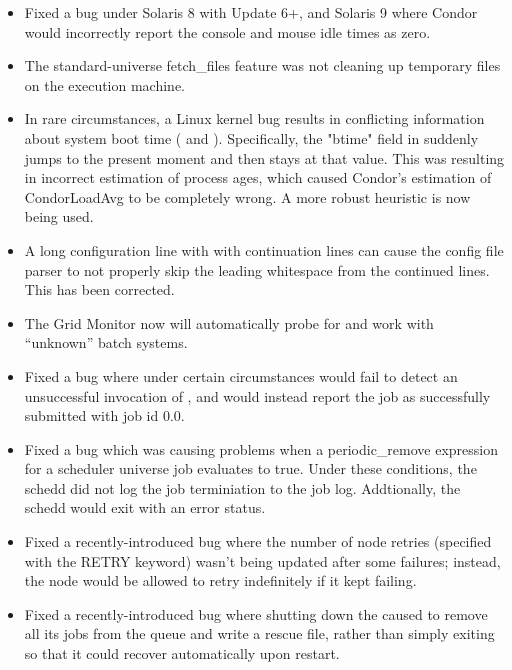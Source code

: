 \begin{itemize}

\item Fixed a bug under Solaris 8 with Update 6+, and Solaris 9 where
Condor would incorrectly report the console and mouse idle times as zero.

\item The standard-universe fetch\_files feature was not cleaning up
temporary files on the execution machine.

\item In rare circumstances, a Linux kernel bug results in conflicting
information about system boot time ( and
). 
Specifically, the "btime" field in  suddenly jumps to
the present moment and then stays at that value.  This
was resulting in incorrect estimation of process ages, which caused
Condor's estimation of CondorLoadAvg to be completely wrong.  A more
robust heuristic is now being used.

\item A long configuration line with with continuation lines can cause the
config file parser to not properly skip the leading whitespace from
the continued lines.  This has been corrected.

\item The Grid Monitor now will automatically probe for and work with
``unknown'' batch systems.

\item Fixed a bug where under certain circumstances 
      would fail to detect an unsuccessful invocation of
      , and would instead report the job as
      successfully submitted with job id 0.0.

\item Fixed a bug which was causing problems when a periodic\_remove
expression for a scheduler universe job evaluates to true.  Under
these conditions, the schedd did not log the job terminiation to the
job log.  Addtionally, the schedd would exit with an error status.

\item Fixed a recently-introduced  bug where the number
      of node retries (specified with the RETRY keyword) wasn't being
      updated after some failures; instead, the node would be allowed
      to retry indefinitely if it kept failing.

\item Fixed a recently-introduced bug where shutting down the
       caused  to remove all its jobs
      from the queue and write a rescue file, rather than simply
      exiting so that it could recover automatically upon restart.


\end{itemize}

